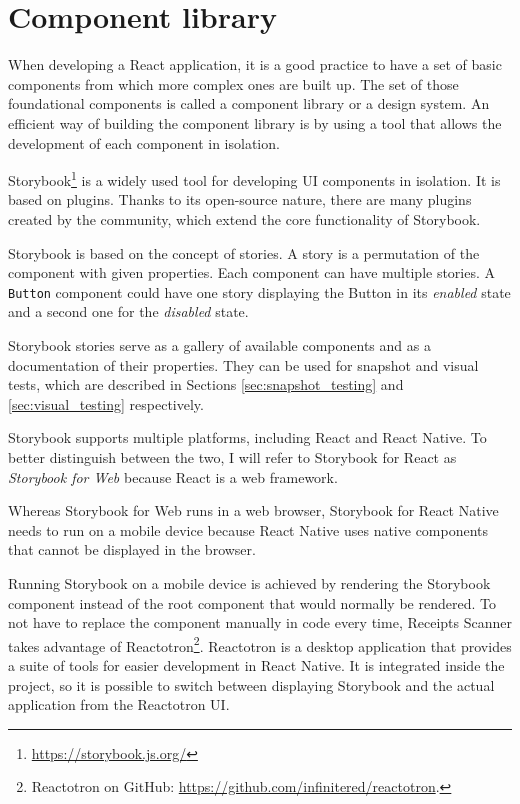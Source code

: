 \documentclass[
  digital, %
  table,   %
  oneside, %
  lof,     %
  lot,     %
]{fithesis3}
\begin{document}
\section{Component library}
\label{sec:component_library}
When developing a React application, it is a good practice to have a set of basic components from which more complex ones are built up. The set of those foundational components is called a component library or a design system. An efficient way of building the component library is by using a tool that allows the development of each component in isolation. 

Storybook\footnote{\url{https://storybook.js.org/}} is a widely used tool for developing UI components in isolation. It is based on plugins. Thanks to its open-source nature, there are many plugins created by the community, which extend the core functionality of Storybook.

Storybook is based on the concept of stories. A story is a permutation of the component with given properties. Each component can have multiple stories. A \texttt{Button} component could have one story displaying the Button in its \textit{enabled} state and a second one for the \textit{disabled} state.

Storybook stories serve as a gallery of available components and as a documentation of their properties. They can be used for snapshot and visual tests, which are described in Sections \ref{sec:snapshot_testing} and \ref{sec:visual_testing} respectively.

Storybook supports multiple platforms, including React and React Native. To better distinguish between the two, I will refer to Storybook for React as \textit{Storybook for Web} because React is a web framework.

Whereas Storybook for Web runs in a web browser, Storybook for React Native needs to run on a mobile device because React Native uses native components that cannot be displayed in the browser.

\label{phantom:reactotron}
Running Storybook on a mobile device is achieved by rendering the Storybook component instead of the root component that would normally be rendered. To not have to replace the component manually in code every time, Receipts Scanner takes advantage of Reactotron\footnote{Reactotron on GitHub: \url{https://github.com/infinitered/reactotron}.}. Reactotron is a desktop application that provides a suite of tools for easier development in React Native. It is integrated inside the project, so it is possible to switch between displaying Storybook and the actual application from the Reactotron UI. 
\end{document}
